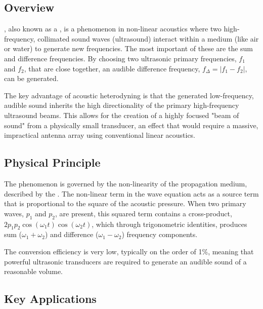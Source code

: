 \subsection{Overview}

, also known as a , is a phenomenon in non-linear acoustics where two high-frequency, collimated sound waves (ultrasound) interact within a medium (like air or water) to generate new frequencies. The most important of these are the sum and difference frequencies. By choosing two ultrasonic primary frequencies, $f_1$ and $f_2$, that are close together, an audible difference frequency, $f_{\Delta} = |f_1 - f_2|$, can be generated.

\begin{keyconcept}
    The key advantage of acoustic heterodyning is that the generated low-frequency, audible sound inherits the high directionality of the primary high-frequency ultrasound beams. This allows for the creation of a highly focused "beam of sound" from a physically small transducer, an effect that would require a massive, impractical antenna array using conventional linear acoustics.
\end{keyconcept}


\subsection{Physical Principle}

The phenomenon is governed by the non-linearity of the propagation medium, described by the . The non-linear term in the wave equation acts as a source term that is proportional to the square of the acoustic pressure. When two primary waves, $p_1$ and $p_2$, are present, this squared term contains a cross-product, $2p_1p_2\cos(\omega_1 t)\cos(\omega_2 t)$, which through trigonometric identities, produces sum ($\omega_1+\omega_2$) and difference ($\omega_1-\omega_2$) frequency components.

The conversion efficiency is very low, typically on the order of 1\%, meaning that powerful ultrasonic transducers are required to generate an audible sound of a reasonable volume.


\subsection{Key Applications}

